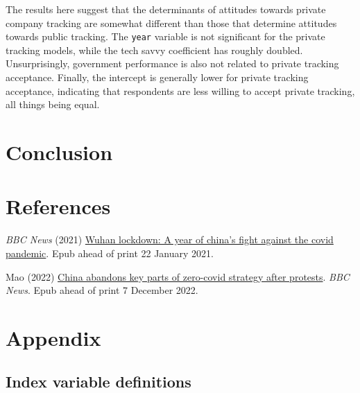 \documentclass[
  letterpaper,
  DIV=11,
  numbers=noendperiod]{scrartcl}
\newlength{\cslhangindent}
\newenvironment{CSLReferences}[2] %
 {\begin{list}{}{%
  \setlength{\itemindent}{0pt}
  \setlength{\leftmargin}{0pt}
  \setlength{\parsep}{0pt}
  \ifodd #1
   \setlength{\leftmargin}{\cslhangindent}
   \setlength{\itemindent}{-1\cslhangindent}
  \fi
  \setlength{\itemsep}{#2\baselineskip}}}
 {\end{list}}
\begin{document}
The results here suggest that the determinants of attitudes towards
private company tracking are somewhat different than those that
determine attitudes towards public tracking. The \texttt{year} variable
is not significant for the private tracking models, while the tech savvy
coefficient has roughly doubled. Unsurprisingly, government performance
is also not related to private tracking acceptance. Finally, the
intercept is generally lower for private tracking acceptance, indicating
that respondents are less willing to accept private tracking, all things
being equal.

\section{Conclusion}\label{sec-conclusion}

\newpage{}

\section{References}\label{references}

\label{refs}
\begin{CSLReferences}{1}{1}
\emph{BBC News} (2021)
\href{https://www.bbc.com/news/world-asia-china-55628488}{Wuhan
lockdown: A year of china's fight against the covid pandemic}. Epub
ahead of print 22 January 2021.

Mao (2022)
\href{https://www.bbc.com/news/world-asia-china-63855508}{China abandons
key parts of zero-covid strategy after protests}. \emph{BBC News}. Epub
ahead of print 7 December 2022.

\end{CSLReferences}

\newpage{}

\section{Appendix}\label{sec-appendix}

\subsection{Index variable
definitions}\label{index-variable-definitions}

\begin{table}

\caption{\label{tbl-ts.q.text}Tech savvy index questions}


\end{table}%
\end{document}
